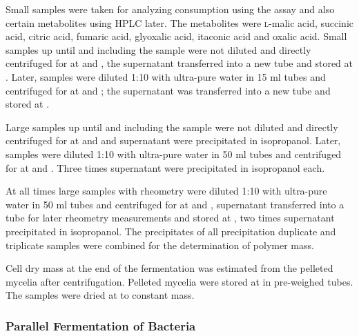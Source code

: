 Small samples were taken for analyzing \glc{} consumption using the \glc{} assay and also certain metabolites using HPLC later. The metabolites were \textsc{l}-malic acid, succinic acid, citric acid, fumaric acid, glyoxalic acid, itaconic acid and oxalic acid. Small samples up until and including the  sample were not diluted and directly centrifuged for  at  and , the supernatant transferred into a new tube and stored at . Later, samples were diluted 1:10 with  ultra-pure water in 15 ml tubes and centrifuged for  at  and ; the supernatant was transferred into a new tube and stored at .

Large samples up until and including the  sample were not diluted and directly centrifuged for  at  and  and  supernatant were precipitated in  isopropanol. Later, samples were diluted 1:10 with  ultra-pure water in 50 ml tubes and centrifuged for  at  and . Three times  supernatant were precipitated in  isopropanol each.

At all times large samples with rheometry were diluted 1:10 with  ultra-pure water in 50 ml tubes and centrifuged for  at  and ,  supernatant transferred into a tube for later rheometry measurements and stored at , two times  supernatant precipitated in  isopropanol. The precipitates of all precipitation duplicate and triplicate samples were combined for the determination of polymer mass.

Cell dry mass at the end of the fermentation was estimated from the pelleted mycelia after centrifugation. Pelleted mycelia were stored at  in pre-weighed  tubes. The samples were dried at  to constant mass.

\subsubsection{Parallel Fermentation of Bacteria\label{subsubsec-met-mibi-ferm-dasgip}}
